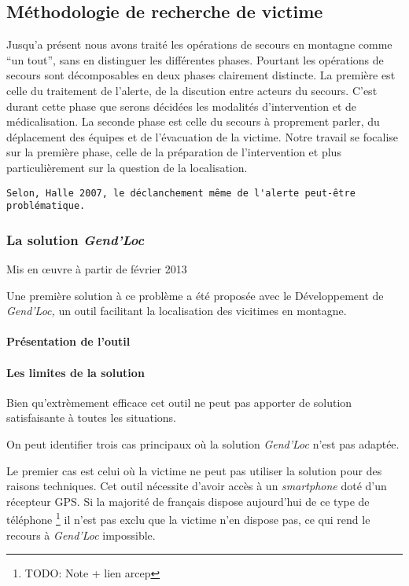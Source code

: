 \subsection{Méthodologie de recherche de victime}
\label{susec:1-1-2}

Jusqu'a présent nous avons traité les opérations de secours en
montagne comme \enquote{un tout}, sans en distinguer les différentes
phases. Pourtant les opérations de secours sont décomposables en deux
phases clairement distincte. La première est celle du traitement de
l'alerte, de la discution entre acteurs du secours. C'est durant cette
phase que serons décidées les modalités d'intervention et de
médicalisation. La seconde phase est celle du secours à proprement
parler, du déplacement des équipes et de l'évacuation de la
victime. Notre travail se focalise sur la première phase, celle de la
préparation de l'intervention et plus particulièrement sur la question
de la localisation.



\begin{verbatim}
Selon, Halle 2007, le déclanchement même de l'alerte peut-être
problématique. 
\end{verbatim}

\subsubsection{La solution \emph{Gend'Loc}}
\label{subsec:1-1-2-1}

Mis en œuvre à partir de février 2013

Une première solution à ce problème a été proposée avec le
Développement de \emph{Gend'Loc,} un outil facilitant la localisation
des vicitimes en montagne.

\paragraph{Présentation de l'outil}

\paragraph{Les limites de la solution}

Bien qu'extrèmement efficace cet outil ne peut pas apporter de
solution satisfaisante à toutes les situations.

On peut identifier trois cas principaux où la solution \emph{Gend'Loc}
n'est pas adaptée.

Le premier cas est celui où la victime ne peut pas utiliser la
solution pour des raisons techniques. Cet outil nécessite d'avoir
accès à un \emph{smartphone} doté d'un récepteur GPS. Si la majorité
de français dispose aujourd'hui de ce type de téléphone
\footnote{TODO: Note + lien arcep} il n'est pas exclu que la victime
n'en dispose pas, ce qui rend le recours à \emph{Gend'Loc} impossible.

